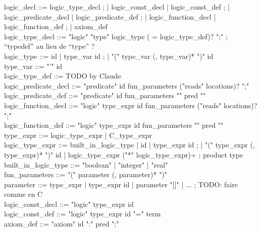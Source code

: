 \begin{syntax}
  logic_decl ::= logic_type_decl ;
          | logic_const_decl | logic_const_def ;
          | logic_predicate_decl | logic_predicate_def ;
          | logic_function_decl | logic_function_def ;
          | axiom_def
  \\
  logic_type_decl ::= "logic" "type" logic_type ( = logic_type_def)? ";" ; ``typedef'' au lieu de ``type'' ?
  \\
  logic_type ::= id | type_var id ;
                 | "(" type_var (, type_var)* ")" id 
                 \\
  type_var ::= "'" id 
  \\
  logic_type_def ::= TODO by Claude 
  \\
  logic_predicate_decl ::= "predicate" id fun_parameters ("reads" locations)? ";"
  \\
  logic_predicate_def ::= "predicate" id fun_parameters "{" pred "}"
  \\
  logic_function_decl ::= "logic" type_expr id fun_parameters ("reads" locations)? ";"
  \\
  logic_function_def ::= "logic" type_expr id fun_parameters "{" pred "}"
  \\
  type_expr ::= logic_type_expr | C_type_expr
  \\
  logic_type_expr ::= built_in_logic_type | id | type_expr id ;
                 | "(" type_expr (, type_expr)* ")" id 
                 | logic_type_expr ("*" logic_type_expr)+  ; product type 
  \\
  built_in_logic_type ::= "boolean" | "integer" | "real" 
  \\
  fun_parameters ::= "(" parameter (, parameter)* ")"
  \\
  parameter ::= type_expr | type_expr id | parameter "[]" | ... ; TODO: faire comme en C
  \\
  logic_const_decl ::= "logic" type_expr id 
  \\
  logic_const_def ::= "logic" type_expr id "=" term
  \\
axiom_def ::= "axiom" id ":" pred ";"
\end{syntax}